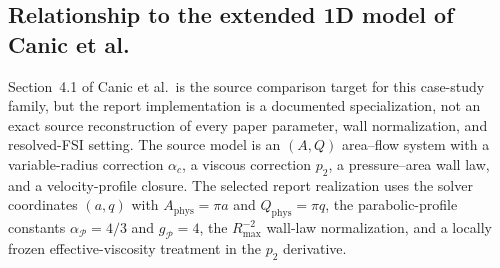\subsection{Relationship to the extended 1D model of Canic et al.}
\label{app:num-source-implementation-map}

Section~4.1 of Canic et al.\ is the source comparison target for this
case-study family, but the report implementation is a documented
specialization, not an exact source reconstruction of every
paper parameter, wall normalization, and resolved-FSI setting. The source model is an
$(A,Q)$ area--flow system with a variable-radius correction $\alpha_c$, a
viscous correction $p_2$, a pressure--area wall law, and a velocity-profile
closure. The selected report realization uses the solver coordinates
$(a,q)$ with $A_{\mathrm{phys}}=\pi a$ and $Q_{\mathrm{phys}}=\pi q$, the
parabolic-profile constants $\alpha_{\mathcal P}=4/3$ and
$g_{\mathcal P}=4$, the $R_{\max}^{-2}$ wall-law normalization, and a locally
frozen effective-viscosity treatment in the $p_2$ derivative.

